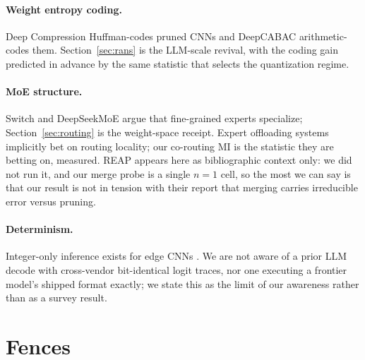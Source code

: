 \documentclass[11pt]{article}
\begin{document}
\paragraph{Weight entropy coding.}
Deep Compression \cite{deepcompression} Huffman-codes pruned CNNs and DeepCABAC
\cite{deepcabac} arithmetic-codes them. Section~\ref{sec:rans} is the LLM-scale
revival, with the coding gain predicted in advance by the same statistic that
selects the quantization regime.

\paragraph{MoE structure.}
Switch \cite{switch} and DeepSeekMoE \cite{deepseekmoe} argue that fine-grained
experts specialize; Section~\ref{sec:routing} is the weight-space receipt. Expert
offloading systems \cite{moeoffload} implicitly bet on routing locality; our
co-routing MI is the statistic they are betting on, measured. REAP
\cite{reap} appears here as bibliographic context only: we did not run it, and
our merge probe is a single $n{=}1$ cell, so the most we can say is that our
result is not in tension with their report that merging carries irreducible
error versus pruning.

\paragraph{Determinism.}
Integer-only inference exists for edge CNNs \cite{jacob}. We are not aware of a
prior LLM decode with cross-vendor bit-identical logit traces, nor one executing
a frontier model's shipped format exactly; we state this as the limit of our
awareness rather than as a survey result.

\section{Fences}
\label{sec:fences}
\end{document}
